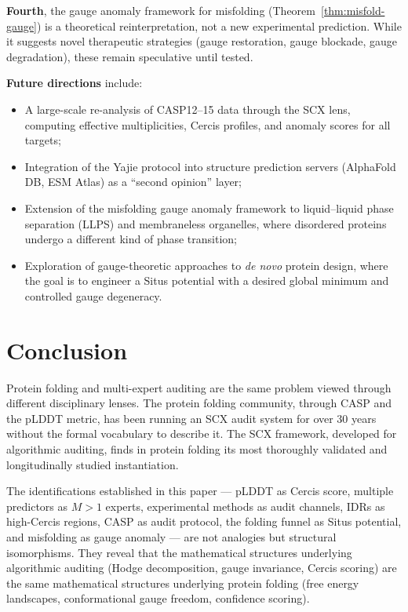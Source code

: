 \documentclass[12pt,a4paper]{article}
\theoremstyle{remark}
\begin{document}
\textbf{Fourth}, the gauge anomaly framework for misfolding (Theorem~\ref{thm:misfold-gauge}) is a theoretical reinterpretation, not a new experimental prediction.
While it suggests novel therapeutic strategies (gauge restoration, gauge blockade, gauge degradation), these remain speculative until tested.

\textbf{Future directions} include:
\begin{itemize}[leftmargin=*]
    \item A large-scale re-analysis of CASP12--15 data through the SCX lens, computing effective multiplicities, Cercis profiles, and anomaly scores for all targets;
    \item Integration of the Yajie protocol into structure prediction servers (AlphaFold DB, ESM Atlas) as a ``second opinion'' layer;
    \item Extension of the misfolding gauge anomaly framework to liquid--liquid phase separation (LLPS) and membraneless organelles, where disordered proteins undergo a different kind of phase transition;
    \item Exploration of gauge-theoretic approaches to \emph{de novo} protein design, where the goal is to engineer a Situs potential with a desired global minimum and controlled gauge degeneracy.
\end{itemize}

\section{Conclusion}
\label{sec:conclusion}

Protein folding and multi-expert auditing are the same problem viewed through different disciplinary lenses.
The protein folding community, through CASP and the pLDDT metric, has been running an SCX audit system for over 30 years without the formal vocabulary to describe it.
The SCX framework, developed for algorithmic auditing, finds in protein folding its most thoroughly validated and longitudinally studied instantiation.

The identifications established in this paper — pLDDT as Cercis score, multiple predictors as $M > 1$ experts, experimental methods as audit channels, IDRs as high-Cercis regions, CASP as audit protocol, the folding funnel as Situs potential, and misfolding as gauge anomaly — are not analogies but structural isomorphisms.
They reveal that the mathematical structures underlying algorithmic auditing (Hodge decomposition, gauge invariance, Cercis scoring) are the same mathematical structures underlying protein folding (free energy landscapes, conformational gauge freedom, confidence scoring).
\end{document}

